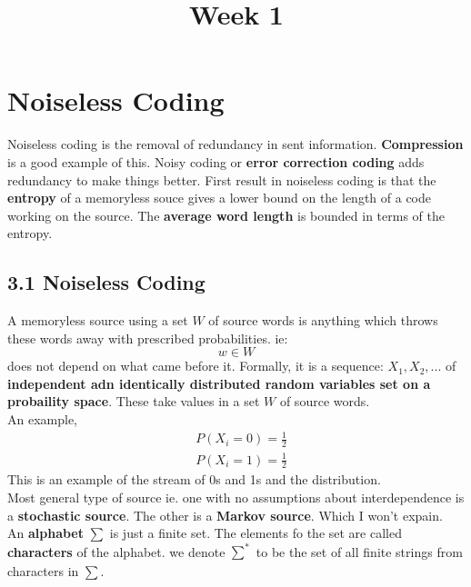 \documentclass{article}
\begin{document}
\title{Week 1}
\section{Noiseless Coding}

Noiseless coding is the removal of redundancy in sent information. \textbf{Compression} is a good example of this.
Noisy coding or \textbf{error correction coding} adds redundancy to make things better. First result in noiseless coding is that the 
\textbf{entropy} of a memoryless souce gives a lower bound on the length of a code working on the source. The \textbf{average word length} is bounded in terms of the entropy.

\subsection{3.1 Noiseless Coding}
A memoryless source using a set $W$ of source words is anything which throws these words away with prescribed probabilities.
ie:
\[w \in W\]
does not depend on what came before it.
Formally, it is a sequence: $X_1, X_2,...$ of \textbf{independent adn identically distributed random variables set on a probaility space}. These take values in a set $W$ of source words.
\\
An example,
\begin{align*}
    &P(X_i = 0) = \frac{1}{2}\\
    &P(X_i = 1) = \frac{1}{2}
\end{align*}
This is an example of the stream of 0s and 1s and the distribution.
\\
Most general type of source ie. one with no assumptions about interdependence is a \textbf{stochastic source}. The other is a \textbf{Markov source}. Which I won't expain.
\\
An \textbf{alphabet} $\sum$ is just a finite set. The elements fo the set are called \textbf{characters} of the alphabet. 
we denote $\sum_{}^{*}$ to be the set of all finite strings from characters in $\sum$.
\end{document}
